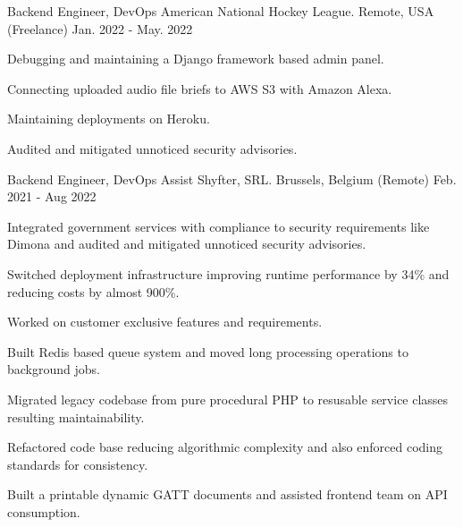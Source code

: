\begin{cventries}
  \cventry
    {Backend Engineer, DevOps} %
    {American National Hockey League.} %
    {Remote, USA (Freelance)} %
    {Jan. 2022 - May. 2022} %
    {
      \begin{cvitems} %
        \item {Debugging and maintaining a Django framework based admin panel.}
        \item {Connecting uploaded audio file briefs to AWS S3 with Amazon Alexa.}
        \item {Maintaining deployments on Heroku.}
        \item {Audited and mitigated unnoticed security advisories.}
      \end{cvitems}
    }

  \cventry
    {Backend Engineer, DevOps Assist} %
    {Shyfter, SRL.} %
    {Brussels, Belgium (Remote)} %
    {Feb. 2021 - Aug 2022} %
    {
      \begin{cvitems} %
        \item {Integrated government services with compliance to security requirements like Dimona and audited and mitigated unnoticed security advisories.}
        \item {Switched deployment infrastructure improving runtime performance by 34\% and reducing costs by almost 900\%.}
        \item {Worked on customer exclusive features and requirements.}
        \item {Built Redis based queue system and moved long processing operations to background jobs.}
        \item {Migrated legacy codebase from pure procedural PHP to resusable service classes resulting maintainability.}
        \item {Refactored code base reducing algorithmic complexity and also enforced coding standards for consistency.}
        \item {Built a printable dynamic GATT documents and assisted frontend team on API consumption.}
      \end{cvitems}
    }


\end{cventries}
